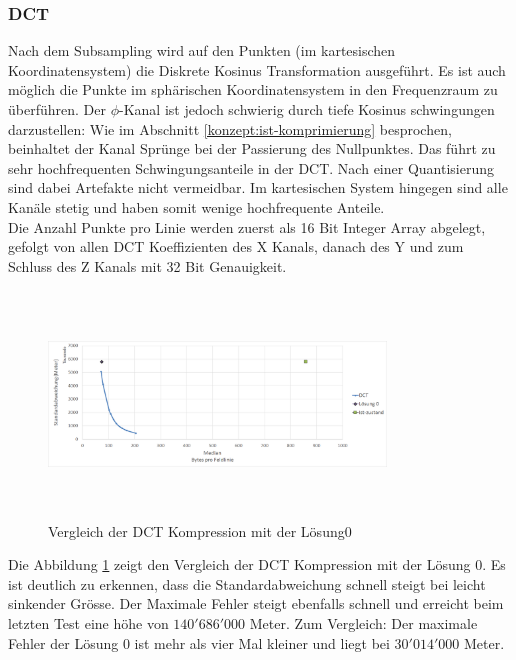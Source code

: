 \subsubsection{DCT}\label{resultate:dct}
Nach dem Subsampling wird auf den Punkten (im kartesischen Koordinatensystem) die Diskrete Kosinus Transformation ausgeführt. Es ist auch möglich die Punkte im sphärischen Koordinatensystem in den Frequenzraum zu überführen. Der $\phi$-Kanal ist jedoch schwierig durch tiefe Kosinus schwingungen darzustellen: Wie im Abschnitt \ref{konzept:ist-komprimierung} besprochen, beinhaltet der Kanal Sprünge bei der Passierung des Nullpunktes. Das führt zu sehr hochfrequenten Schwingungsanteile in der DCT. Nach einer Quantisierung sind dabei Artefakte nicht vermeidbar. Im kartesischen System hingegen sind alle Kanäle stetig und haben somit wenige hochfrequente Anteile.\\
Die Anzahl Punkte pro Linie werden zuerst als 16 Bit Integer Array abgelegt, gefolgt von allen DCT Koeffizienten des X Kanals, danach des Y und zum Schluss des Z Kanals mit 32 Bit Genauigkeit.\\
\begin{figure}[!htbp]
	\center
	\includegraphics[width=0.8\textwidth,height=6cm,keepaspectratio]{./pictures/resultate/loesung1/loesung1-0/loesung1_0.png}
	\caption{Vergleich der DCT Kompression mit der Lösung0}
	\label{resultate:loesung1:dct:resultate}
\end{figure}
Die Abbildung \ref{resultate:loesung1:dct:resultate} zeigt den Vergleich der DCT Kompression mit der Lösung 0. Es ist deutlich zu erkennen, dass die Standardabweichung schnell steigt bei leicht sinkender Grösse. Der Maximale Fehler steigt ebenfalls schnell und erreicht beim letzten Test eine höhe von $140'686'000$ Meter. Zum Vergleich: Der maximale Fehler der Lösung 0 ist mehr als vier Mal kleiner und liegt bei $30'014'000$ Meter.\\
